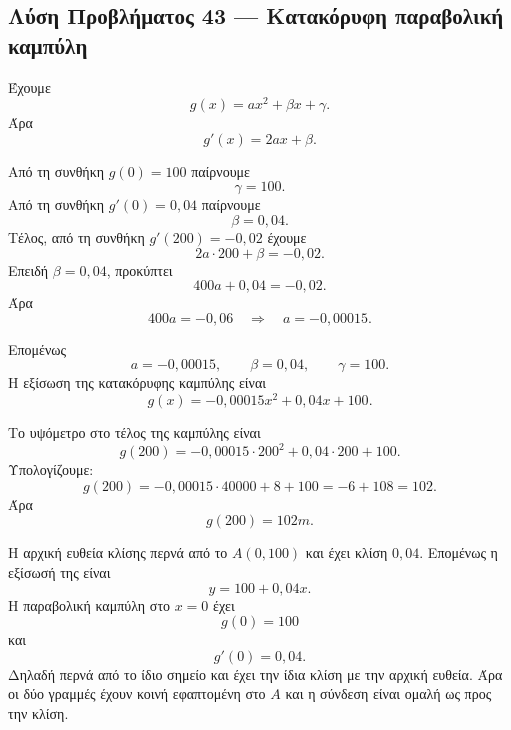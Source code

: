 \subsection*{Λύση Προβλήματος 43 --- Κατακόρυφη παραβολική καμπύλη}

\begin{alist}
  \item Έχουμε
        \[
          g(x)=ax^2+\beta x+\gamma.
        \]
        Άρα
        \[
          g'(x)=2ax+\beta.
        \]

        Από τη συνθήκη $g(0)=100$ παίρνουμε
        \[
          \gamma=100.
        \]
        Από τη συνθήκη $g'(0)=0{,}04$ παίρνουμε
        \[
          \beta=0{,}04.
        \]
        Τέλος, από τη συνθήκη $g'(200)=-0{,}02$ έχουμε
        \[
          2a\cdot200+\beta=-0{,}02.
        \]
        Επειδή $\beta=0{,}04$, προκύπτει
        \[
          400a+0{,}04=-0{,}02.
        \]
        Άρα
        \[
          400a=-0{,}06
          \quad\Rightarrow\quad
          a=-0{,}00015.
        \]

        Επομένως
        \[
          {
          a=-0{,}00015,\qquad
          \beta=0{,}04,\qquad
          \gamma=100
          }.
        \]
        Η εξίσωση της κατακόρυφης καμπύλης είναι
        \[
          {g(x)=-0{,}00015x^2+0{,}04x+100}.
        \]

  \item Το υψόμετρο στο τέλος της καμπύλης είναι
        \[
          g(200)
          =
          -0{,}00015\cdot200^2+0{,}04\cdot200+100.
        \]
        Υπολογίζουμε:
        \[
          g(200)
          =
          -0{,}00015\cdot40000+8+100
          =
          -6+108
          =
          102.
        \]
        Άρα
        \[
          {g(200)=102\si{m}}.
        \]

  \item Η αρχική ευθεία κλίσης περνά από το $A(0,100)$ και έχει κλίση
        $0{,}04$. Επομένως η εξίσωσή της είναι
        \[
          y=100+0{,}04x.
        \]
        Η παραβολική καμπύλη στο $x=0$ έχει
        \[
          g(0)=100
        \]
        και
        \[
          g'(0)=0{,}04.
        \]
        Δηλαδή περνά από το ίδιο σημείο και έχει την ίδια κλίση με την
        αρχική ευθεία. Άρα οι δύο γραμμές έχουν κοινή εφαπτομένη στο
        $A$ και η σύνδεση είναι ομαλή ως προς την κλίση.
\end{alist}
